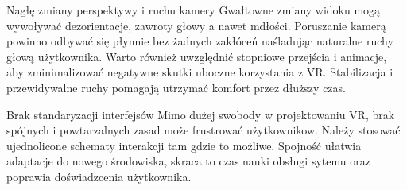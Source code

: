 Nagłę zmiany perspektywy i ruchu kamery
Gwałtowne zmiany widoku mogą wywoływać dezorientacje, zawroty głowy a nawet mdłości. Poruszanie kamerą powinno odbywać się płynnie bez żadnych zakłóceń  naśladując naturalne ruchy głową użytkownika. Warto również uwzględnić stopniowe przejścia i animacje, aby zminimalizować negatywne skutki uboczne korzystania z VR. Stabilizacja i przewidywalne ruchy pomagają utrzymać komfort przez dłuższy czas. 

Brak standaryzacji interfejsów
Mimo dużej swobody w projektowaniu VR, brak spójnych i powtarzalnych zasad może frustrować użytkownikow. Należy stosować ujednolicone schematy interakcji tam gdzie to możliwe. Spojność ułatwia adaptacje do nowego środowiska, skraca to czas nauki obsługi sytemu oraz poprawia doświadzcenia użytkownika. 



